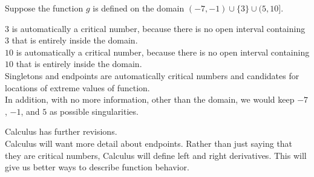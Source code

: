 \documentclass{ximera}
\begin{document}
\begin{example}


Suppose the function $g$ is defined on the domain $(-7, -1) \cup \{ 3 \} \cup (5, 10]$.

$3$ is automatically a critical number, because there is no open interval containing $3$ that is entirely inside the domain.\\

$10$ is automatically a critical number, because there is no open interval containing $10$ that is entirely inside the domain.\\



Singletons and endpoints are automatically critical numbers and candidates for locations of extreme values of function. \\




In addition, with no more information, other than the domain, we would keep $-7$, $-1$, and $5$ as possible singularities. \\




\end{example}



Calculus has further revisions.\\


Calculus will want more detail about endpoints.  Rather than just saying that they are critical numbers, Calculus will define left and right derivatives.  This will give us better ways to describe function behavior. \\
\end{document}
